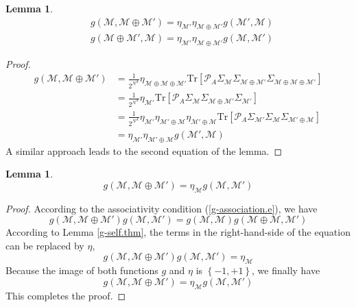 \documentclass[12font]{article}
\theoremstyle{definition}
\newtheorem{lemma}[theorem]{Lemma}
\numberwithin{equation}{section}
\newcommand{\lrm}[1]{\left[  #1  \right]}
\newcommand{\lrg}[1]{\left\{  #1  \right\}}
\newcommand{\mrm}[1]{\mathrm{#1}}
\newcommand{\Tr}{\mrm{Tr}}
\begin{document}
\begin{lemma}\label{g-reduce-theorem.thm}
  \[
    \begin{aligned}
    & g(\mathcal{M},\mathcal{M}\oplus\mathcal{M}') = \eta_{\mathcal{M}'}\eta_{\mathcal{M}\oplus\mathcal{M}'} g(\mathcal{M}',\mathcal{M}) \\
    & g(\mathcal{M}\oplus\mathcal{M}',\mathcal{M}) = \eta_{\mathcal{M}'}\eta_{\mathcal{M}\oplus\mathcal{M}'} g(\mathcal{M},\mathcal{M}')
    \end{aligned}
  \]
\end{lemma}
\begin{proof}
  \begin{align*}
    g(\mathcal{M},\mathcal{M}\oplus\mathcal{M}') &= \frac{1}{2^{N^A}}\eta_{\mathcal{M}\oplus\mathcal{M}\oplus\mathcal{M}'}\Tr\lrm{\mathcal{P}_A\Sigma_{\mathcal{M}}\Sigma_{\mathcal{M}\oplus\mathcal{M}'}\Sigma_{\mathcal{M}\oplus\mathcal{M}\oplus\mathcal{M}'}} \\
    &= \frac{1}{2^{N^A}}\eta_{\mathcal{M}'}\Tr\lrm{\mathcal{P}_A\Sigma_{\mathcal{M}}\Sigma_{\mathcal{M}\oplus\mathcal{M}'}\Sigma_{\mathcal{M}'}} \\
    &= \frac{1}{2^{N^A}}\eta_{\mathcal{M}'}\eta_{\mathcal{M}'\oplus\mathcal{M}}\eta_{\mathcal{M}'\oplus\mathcal{M}}\Tr\lrm{\mathcal{P}_A\Sigma_{\mathcal{M}'}\Sigma_{\mathcal{M}}\Sigma_{\mathcal{M}'\oplus\mathcal{M}}} \\
    &=\eta_{\mathcal{M}'}\eta_{\mathcal{M}'\oplus\mathcal{M}} g(\mathcal{M}',\mathcal{M})
  \end{align*}
  A similar approach leads to the second equation of the lemma.
\end{proof}
\begin{lemma}\label{g_reduce_symmetric.e}
  \[g(\mathcal{M}, \mathcal{M}\oplus\mathcal{M}') = \eta_{\mathcal{M}}g(\mathcal{M},\mathcal{M}')\]
\end{lemma}
\begin{proof}
  According to the associativity condition (\ref{g-association.e}), we have
  \[
  g(\mathcal{M},\mathcal{M}\oplus\mathcal{M}')g(\mathcal{M},\mathcal{M}') = g(\mathcal{M},\mathcal{M})g(\mathcal{M}\oplus\mathcal{M},\mathcal{M}')
  \]
  According to Lemma \ref{g-self.thm}, the terms in the right-hand-side of the equation can be replaced by $\eta$, 
  \[
  g(\mathcal{M},\mathcal{M}\oplus\mathcal{M}')g(\mathcal{M},\mathcal{M}') = \eta_{\mathcal{M}}
  \]
  Because the image of both functions $g$ and $\eta$ is $\lrg{-1,+1}$, we finally have
  \[
  g(\mathcal{M},\mathcal{M}\oplus\mathcal{M}') = \eta_{\mathcal{M}}g(\mathcal{M},\mathcal{M}')
  \]
  This completes the proof.
\end{proof}
\end{document}
